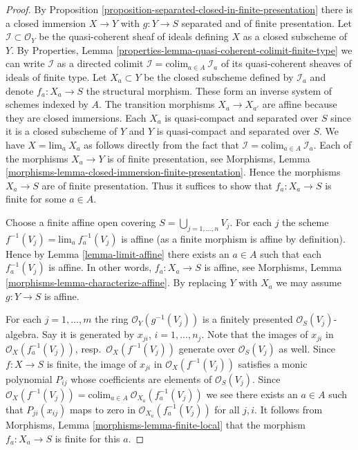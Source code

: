 \begin{proof}
By Proposition \ref{proposition-separated-closed-in-finite-presentation}
there is a closed immersion $X \to Y$ with $g : Y \to S$
separated and of finite presentation. Let $\mathcal{I} \subset \mathcal{O}_Y$
be the quasi-coherent sheaf of ideals defining $X$ as a closed
subscheme of $Y$. By
Properties, Lemma \ref{properties-lemma-quasi-coherent-colimit-finite-type} 
we can write $\mathcal{I}$ as a directed colimit
$\mathcal{I} = \text{colim}_{a \in A}\ \mathcal{I}_a$ of its
quasi-coherent sheaves of ideals of finite type.
Let $X_a \subset Y$ be the closed subscheme defined by $\mathcal{I}_a$
and denote $f_a : X_a \to S$ the structural morphism.
These form an inverse system of schemes indexed by $A$.
The transition morphisms $X_a \to X_{a'}$ are affine because
they are closed immersions. Each $X_a$ is quasi-compact and separated
over $S$ since it is a closed subscheme of $Y$ and $Y$ is quasi-compact and
separated over $S$.
We have $X = \text{lim}_a\ X_a$ as follows directly from the
fact that $\mathcal{I} = \text{colim}_{a \in A}\ \mathcal{I}_a$.
Each of the morphisms $X_a \to Y$ is of finite presentation, see
Morphisms, Lemma \ref{morphisms-lemma-closed-immersion-finite-presentation}.
Hence the morphisms $X_a \to S$ are of finite presentation.
Thus it suffices to show that $f_a : X_a \to S$ is finite for some
$a \in A$.

\medskip\noindent
Choose a finite affine open covering $S = \bigcup_{j = 1, \ldots, n} V_j$.
For each $j$ the scheme $f^{-1}(V_j) = \text{lim}_a\ f_a^{-1}(V_j)$
is affine (as a finite morphism is affine by definition). Hence by
Lemma \ref{lemma-limit-affine} there exists an $a \in A$ such that
each $f_a^{-1}(V_j)$ is affine. In other words, $f_a : X_a \to S$ is
affine, see Morphisms, Lemma \ref{morphisms-lemma-characterize-affine}.
By replacing $Y$ with $X_a$ we may assume $g : Y \to S$ is affine.

\medskip\noindent
For each $j = 1, \ldots, m$ the ring $\mathcal{O}_Y(g^{-1}(V_j))$
is a finitely presented $\mathcal{O}_S(V_j)$-algebra. Say it is
generated by $x_{ji}$, $i = 1, \ldots, n_j$. Note that the images
of $x_{ji}$ in $\mathcal{O}_X(f_a^{-1}(V_j))$, resp.\ 
$\mathcal{O}_X(f^{-1}(V_j))$ generate over $\mathcal{O}_S(V_j)$ as well.
Since $f : X \to S$ is
finite, the image of $x_{ji}$ in $\mathcal{O}_X(f^{-1}(V_j))$
satisfies a monic polynomial $P_{ij}$ whose coefficients
are elements of $\mathcal{O}_S(V_j)$. Since
$\mathcal{O}_X(f^{-1}(V_j)) =
\text{colim}_{a \in A}\ \mathcal{O}_{X_a}(f_a^{-1}(V_j))$
we see there exists an $a \in A$ such that
$P_{ji}(x_{ij})$ maps to zero in $\mathcal{O}_{X_a}(f_a^{-1}(V_j))$
for all $j, i$. It follows from
Morphisms, Lemma \ref{morphisms-lemma-finite-local}
that the morphism $f_a : X_a \to S$ is finite for this $a$.
\end{proof}





















